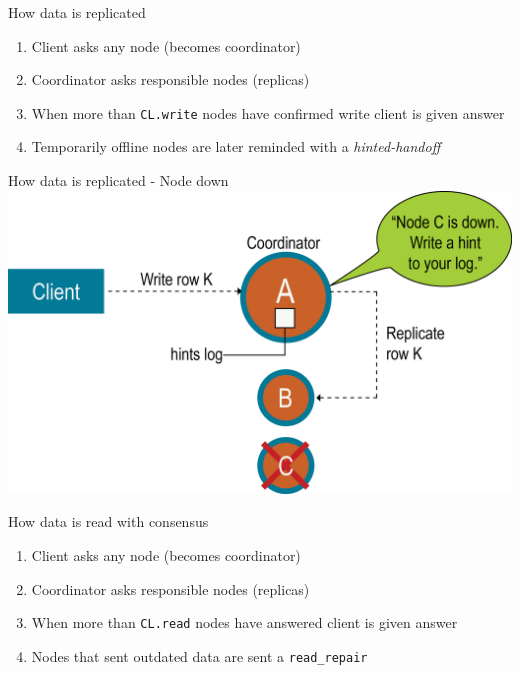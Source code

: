 \documentclass[
  10pt
]{beamer}
\begin{document}
\begin{frame}{How data is replicated}
  \begin{enumerate}
    \item<1-> Client asks any node (becomes coordinator)
    \item<2-> Coordinator asks responsible nodes (replicas)
    \item<3-> When more than \lstinline{CL.write} nodes have confirmed write client is given answer
    \item<4-> Temporarily offline nodes are later reminded with a \textit{hinted-handoff}
  \end{enumerate}
\end{frame}

\begin{frame}{How data is replicated - Node down}
  \includegraphics[width=1.0\textwidth]{resources/hinted_handoff.png}
\end{frame}

\begin{frame}{How data is read with consensus}
  \begin{enumerate}
    \item<1-> Client asks any node (becomes coordinator)
    \item<2-> Coordinator asks responsible nodes (replicas)
    \item<3-> When more than \lstinline{CL.read} nodes have answered client is given answer
    \item<4-> Nodes that sent outdated data are sent a \lstinline{read_repair}
  \end{enumerate}
\end{frame}
\end{document}
